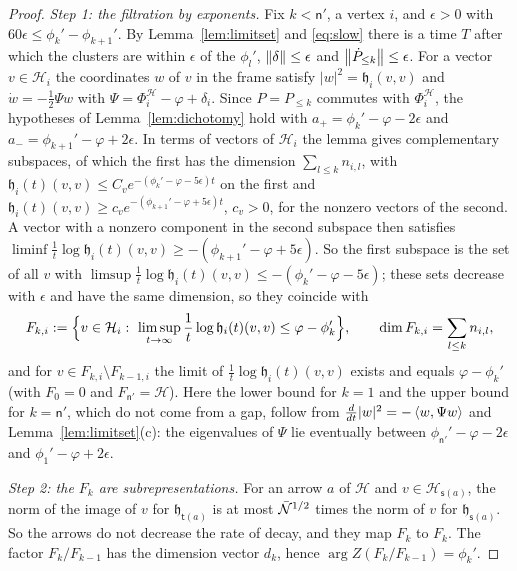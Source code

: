 \begin{proof}
\emph{Step 1: the filtration by exponents.} Fix $k<\mathsf n'$, a vertex
$i$, and $\epsilon>0$ with $60\epsilon\leq\phi_k'-\phi_{k+1}'$. By
Lemma~\ref{lem:limitset} and \eqref{eq:slow} there is a time $T$ after which
the clusters are within $\epsilon$ of the $\phi_l'$,
$\left\lVert\delta\right\rVert\leq\epsilon$ and $\left\lVert\dot P_{\leq k}\right\rVert\leq\epsilon$. For a
vector $v\in\mathcal H_i$ the coordinates $w$ of $v$ in the frame satisfy
$|w|^2=\mathfrak h_i(v,v)$ and $\dot w=-\frac12\Psi w$ with
$\Psi=\Phi^{\mathcal H}_i-\varphi+\delta_i$. Since $P=P_{\leq k}$ commutes
with $\Phi^{\mathcal H}_i$, the hypotheses of Lemma~\ref{lem:dichotomy} hold
with $a_+=\phi_k'-\varphi-2\epsilon$ and
$a_-=\phi_{k+1}'-\varphi+2\epsilon$. In terms of vectors of $\mathcal H_i$
the lemma gives complementary subspaces, of which the first has the
dimension $\sum_{l\leq k}n_{i,l}$, with
$\mathfrak h_i(t)(v,v)\leq C_ve^{-(\phi_k'-\varphi-5\epsilon)t}$ on the
first and
$\mathfrak h_i(t)(v,v)\geq c_ve^{-(\phi_{k+1}'-\varphi+5\epsilon)t}$,
$c_v>0$, for the nonzero vectors of the second. A vector with a nonzero
component in the second subspace then satisfies
$\liminf\frac1t\log\mathfrak h_i(t)(v,v)\geq-(\phi_{k+1}'-\varphi+5\epsilon)$.
So the first subspace is the set of all $v$ with
$\limsup\frac1t\log\mathfrak h_i(t)(v,v)\leq-(\phi_k'-\varphi-5\epsilon)$;
these sets decrease with $\epsilon$ and have the same dimension, so they
coincide with
\[
 F_{k,i}:=\Bigl\{v\in\mathcal H_i:\ \limsup_{t\to\infty}\frac1t\log\mathfrak h_i(t)(v,v)\leq\varphi-\phi_k'\Bigr\},
 \qquad\dim F_{k,i}=\sum_{l\leq k}n_{i,l},
\]
and for $v\in F_{k,i}\setminus F_{k-1,i}$ the limit of
$\frac1t\log\mathfrak h_i(t)(v,v)$ exists and equals $\varphi-\phi_k'$
(with $F_0=0$ and $F_{\mathsf n'}=\mathcal H$). Here the lower bound for
$k=1$ and the upper bound for $k=\mathsf n'$, which do not come from a gap,
follow from $\frac d{dt}|w|^2=-\left\langle w,\Psi w\right\rangle$ and
Lemma~\ref{lem:limitset}(c): the eigenvalues of $\Psi$ lie eventually between
$\phi_{\mathsf n'}'-\varphi-2\epsilon$ and $\phi_1'-\varphi+2\epsilon$.

\emph{Step 2: the $F_k$ are subrepresentations.} For an arrow $a$ of
$\mathcal H$ and $v\in\mathcal H_{\mathsf s(a)}$, the norm of the image of
$v$ for $\mathfrak h_{\mathsf t(a)}$ is at most $\bar{\mathcal N}^{1/2}$ times the
norm of $v$ for $\mathfrak h_{\mathsf s(a)}$. So the arrows do not decrease
the rate of decay, and they map $F_k$ to $F_k$. The factor $F_k/F_{k-1}$ has
the dimension vector $d_k$, hence $\arg Z(F_k/F_{k-1})=\phi_k'$.


\end{proof}
